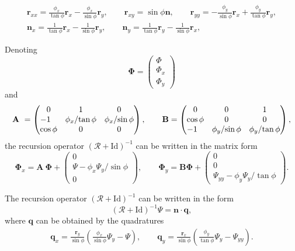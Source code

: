 \documentclass[10pt,a4paper]{amsart}
\def\RO{{\mathcal R}}
\let\ve\mathbf
\begin{document}
\begin{gather}
\ve r_{xx} = \frac{\phi_x}{\tan \phi} \ve r_x - \frac{\phi_x}{\sin \phi} \ve r_y,
\qquad
\ve r_{xy} = \sin \phi \ve n,
\qquad
\ve r_{yy} = -\frac{\phi_y}{\sin \phi} \ve r_x + \frac{\phi_y}{\tan \phi} \ve r_y,
\nonumber
\\
\ve n_x = \frac{1}{\tan \phi} \ve r_x - \frac{1}{\sin \phi} \ve r_y,
\qquad
\ve n_y = \frac{1}{\tan \phi} \ve r_y - \frac{1}{\sin \phi} \ve r_x,
\label{eq:sG:GW}
\end{gather}

\begin{Corollary}
Denoting
\[
\mathbf \Phi = \left(\begin{matrix}
 \Phi \\ \Phi_{x} \\ \Phi_{y}
\end{matrix}\right)
\]
and
\[
\mathbf A~= \left(\begin{matrix}
 0 & 1 & 0 \\
 \llap{$-$}1 & {\phi_x}/{\tan\phi} &
 {\phi_x}/{\sin\phi}
\\
 \cos\phi & 0 & 0
\end{matrix}\right),
\qquad
\mathbf B = \left(\begin{matrix}
 0 & 0 & 1 \\
 \cos\phi & 0 & 0 \\
 \llap{$-$}1 & {\phi_y}/{\sin\phi} &
 \phi_y/{\tan\phi}
\end{matrix}\right),
\]
the recursion operator $(\RO + \mathrm{Id})^{-1}$ can be written in the matrix
form
\begin{equation}
\label{eq:sG:iro:m}
\mathbf \Phi_x
 = \mathbf A~\mathbf \Phi
+ \left(\begin{matrix}
 0 \\
 \Psi - \phi_x\Psi_y/{\sin\phi} \\
 0
\end{matrix}\right),
\qquad
\mathbf \Phi_y
 = \mathbf B \mathbf \Phi
+ \left(\begin{matrix}
 0 \\
 0 \\
 \Psi_{yy} - \phi_y \Psi_y/{\tan\phi}
\end{matrix}\right).
\end{equation}
\end{Corollary}

\begin{Proposition} \label{prop:sG:iro}
The recursion operator $(\RO + \mathrm{Id})^{-1}$ can be written in the form
\[
(\RO + \mathrm{Id})^{-1}\Psi = \ve n \cdot \ve q,
\]
where $\ve q$ can be obtained by the quadratures
\begin{gather}
\ve q_{x}
 = \frac{\ve r_y}{\sin\phi}\left(
 \frac{\phi_x}{\sin\phi}\Psi_y - \Psi\right),
\qquad
\ve q_{y}
 = \frac{\ve r_x}{\sin\phi}\left(
 \frac{\phi_y}{\tan\phi} \Psi_y - \Psi_{yy}\right).
\label{eq:sG:iro:q}
\end{gather}
\end{Proposition}
\end{document}
